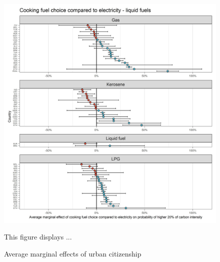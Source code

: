 \documentclass[12pt, a4paper]{article}
\newenvironment{subcaption}
{\strut
\vspace{-5pt}
\begin{minipage}[b]{0.9\textwidth}
  \hspace*{-\parindent}
  \footnotesize}
 {\end{minipage}}
\begin{document}
 \begin{figure}[ht!]
   \centering
   \caption{Average marginal effects of urban citizenship} \label{fig:F7_Electricity_B}
   \includegraphics{Analysis_Logit_Models_Marginal_Effects/Average_Marginal_Effects_affected_upper_80_CF_Electricity B}
   \begin{subcaption}
     This figure displays ...
   \end{subcaption}
 \end{figure}

 \clearpage
\end{document}
